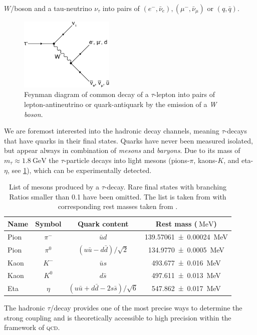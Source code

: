 \documentclass[../../index.tex]{subfiles}
\begin{document}
$W$\-/boson and a tau-neutrino $\nu_\tau$ into pairs of $(e^-, \bar\nu_e),
(\mu^-, \bar\nu_\mu)$ or $(q, \bar q)$.
\begin{figure}
  \centering \includegraphics[width=0.4\textwidth]{images/tauDecay.eps}
  \caption{Feynman diagram of common decay of a $\tau$-lepton into pairs of
    lepton-antineutrino or quark-antiquark by the emission of a \textit{W
      boson}.}
  \label{fig:tauDecay}
\end{figure}
We are foremost interested into the hadronic decay channels, meaning
$\tau$-decays that have quarks in their final states. Quarks have never been
measured isolated, but appear always in combination of \textit{mesons} and
\textit{baryons}. Due to its mass of $m_\tau \approx
\SI{1.8}{\giga\electronvolt}$ the $\tau$-particle decays into light mesons
(pions-$\pi$, kaons-$K$, and eta-$\eta$, see \cref{table:lightMesons}), which
can be experimentally detected.
\begin{table}
  \centering
  \begin{tabular}{lccc}
    \toprule
    Name & Symbol & Quark content & Rest mass ($\SI{}{\mega\electronvolt}$) \\
    \midrule
    Pion & $\pi^-$ & $\bar u d$ & \SI{139.57061 \pm 0.00024}{\mega\electronvolt}  \\
    Pion & $\pi^0$ & $(u \bar u - d \bar d)/\sqrt{2}$ & \SI{134.9770\pm0.0005}{\mega\electronvolt} \\
    Kaon & $K^-$ & $\bar u s$ & \SI{493.677\pm0.016}{\mega\electronvolt} \\
    Kaon & $K^0$ & $d \bar s$ & \SI{497.611\pm0.013}{\mega\electronvolt} \\
    Eta & $\eta$ & $(u \bar u + d \bar d - 2 s \bar s)/\sqrt{6}$ & \SI{547.862\pm0.017}{\mega\electronvolt} \\
  \end{tabular}
  \caption{List of mesons produced by a $\tau$-decay. Rare final states with
    branching Ratios smaller than 0.1 have been omitted. The list is taken from
    \cite{Davier2006} with corresponding rest masses taken from \cite{PDG2018}.}
  \label{table:lightMesons}
\end{table}
The hadronic $\tau$\-/decay provides one of the most precise ways to determine
the strong coupling \cite{Pich2016} and is theoretically accessible to high
precision within the framework of \textsc{qcd}.
\end{document}
